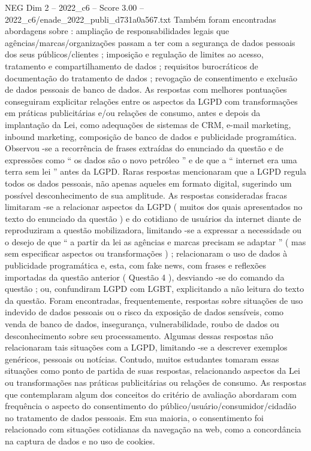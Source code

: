 \begin{textsample}{NEG Dim 2 – 2022\_c6 – Score 3.00 – 2022\_c6/enade\_2022\_publi\_d731a0a567.txt}
Também foram encontradas abordagens sobre : ampliação de responsabilidades legais que agências/marcas/organizações passam a ter com a segurança de dados pessoais dos seus públicos/clientes ; imposição e regulação de limites ao acesso, tratamento e compartilhamento de dados ; requisitos burocráticos de documentação do tratamento de dados ; revogação de consentimento e exclusão de dados pessoais de banco de dados.
As respostas com melhores pontuações conseguiram explicitar relações entre os aspectos da LGPD com transformações em práticas publicitárias e/ou relações de consumo, antes e depois da implantação da Lei, como adequações de sistemas de CRM, e-mail marketing, inbound marketing, composição de banco de dados e publicidade programática.
Observou -se a recorrência de frases extraídas do enunciado da questão e de expressões como “ os dados são o novo petróleo ” e de que a “ internet era uma terra sem lei ” antes da LGPD.
Raras respostas mencionaram que a LGPD regula todos os dados pessoais, não apenas aqueles em formato digital, sugerindo um possível desconhecimento de sua amplitude.
As respostas consideradas fracas limitaram -se a relacionar aspectos da LGPD ( muitos dos quais apresentados no texto do enunciado da questão ) e do cotidiano de usuários da internet diante de reproduziram a questão mobilizadora, limitando -se a expressar a necessidade ou o desejo de que “ a partir da lei as agências e marcas precisam se adaptar ” ( mas sem especificar aspectos ou transformações ) ; relacionaram o uso de dados à publicidade programática e, esta, com fake news, com frases e reflexões importadas da questão anterior ( Questão 4 ), desviando -se do comando da questão ; ou, confundiram LGPD com LGBT, explicitando a não leitura do texto da questão.
Foram encontradas, frequentemente, respostas sobre situações de uso indevido de dados pessoais ou o risco da exposição de dados sensíveis, como venda de banco de dados, insegurança, vulnerabilidade, roubo de dados ou desconhecimento sobre seu processamento.
Algumas dessas respostas não relacionaram tais situações com a LGPD, limitando -se a descrever exemplos genéricos, pessoais ou notícias.
Contudo, muitos estudantes tomaram essas situações como ponto de partida de suas respostas, relacionando aspectos da Lei ou transformações nas práticas publicitárias ou relações de consumo.
As respostas que contemplaram algum dos conceitos do critério de avaliação abordaram com frequência o aspecto do consentimento do público/usuário/consumidor/cidadão no tratamento de dados pessoais.
Em sua maioria, o consentimento foi relacionado com situações cotidianas da navegação na web, como a concordância na captura de dados e no uso de cookies.

\end{textsample}
